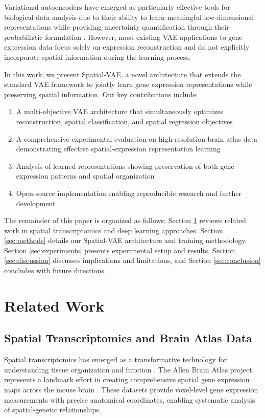 \documentclass[11pt]{article}
\begin{document}
Variational autoencoders have emerged as particularly effective tools for biological data analysis due to their ability to learn meaningful low-dimensional representations while providing uncertainty quantification through their probabilistic formulation \cite{lopez2018deep}. However, most existing VAE applications to gene expression data focus solely on expression reconstruction and do not explicitly incorporate spatial information during the learning process.

In this work, we present Spatial-VAE, a novel architecture that extends the standard VAE framework to jointly learn gene expression representations while preserving spatial information. Our key contributions include:

\begin{enumerate}
\item A multi-objective VAE architecture that simultaneously optimizes reconstruction, spatial classification, and spatial regression objectives
\item A comprehensive experimental evaluation on high-resolution brain atlas data demonstrating effective spatial-expression representation learning
\item Analysis of learned representations showing preservation of both gene expression patterns and spatial organization
\item Open-source implementation enabling reproducible research and further development
\end{enumerate}

The remainder of this paper is organized as follows: Section \ref{sec:related} reviews related work in spatial transcriptomics and deep learning approaches. Section \ref{sec:methods} details our Spatial-VAE architecture and training methodology. Section \ref{sec:experiments} presents experimental setup and results. Section \ref{sec:discussion} discusses implications and limitations, and Section \ref{sec:conclusion} concludes with future directions.

\section{Related Work}
\label{sec:related}

\subsection{Spatial Transcriptomics and Brain Atlas Data}

Spatial transcriptomics has emerged as a transformative technology for understanding tissue organization and function \cite{stahl2016visualization}. The Allen Brain Atlas project represents a landmark effort in creating comprehensive spatial gene expression maps across the mouse brain \cite{lein2007genome}. These datasets provide voxel-level gene expression measurements with precise anatomical coordinates, enabling systematic analysis of spatial-genetic relationships.
\end{document}
